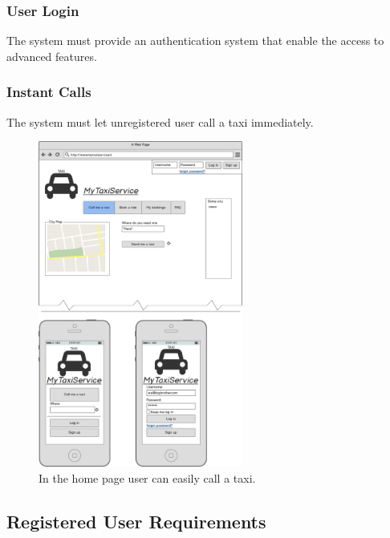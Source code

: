 		\subsubsection {User Login}
		 	The system must provide an authentication system that enable the access to advanced features.
		\subsubsection {Instant Calls}
			The system must let unregistered user call a taxi immediately.
			\begin{figure}[h!]
				\includegraphics[width=0.6\textwidth]{mockup/home}
				\caption{In the home page user can easily call a taxi.}
			\end{figure}
			\newpage
	\subsection {Registered User Requirements}
